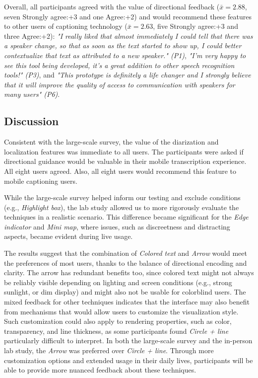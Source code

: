 Overall, all participants agreed with the value of directional feedback ($\bar{x}=2.88$, seven Strongly agree:+3 and one Agree:+2) and would recommend these features to other users of captioning technology ($\bar{x}=2.63$, five Strongly agree:+3 and three Agree:+2): \textit{"I really liked that almost immediately I could tell that there was a speaker change, so that as soon as the text started to show up, I could better contextualize that text as attributed to a new speaker." (P1)}, \textit{"I'm very happy to see this tool being developed, it's a great addition to other speech recognition tools!" (P3)}, and \textit{"This prototype is definitely a life changer and I strongly believe that it will improve the quality of access to communication with speakers for many users" (P6)}.

\subsection{Discussion}
Consistent with the large-scale survey, the value of the diarization and localization features was immediate to all users. The participants were asked if directional guidance would be valuable in their mobile transcription experience. All eight users agreed. Also, all eight users would recommend this feature to mobile captioning users. 

While the large-scale survey helped inform our testing and exclude conditions (e.g., \emph{Highlight box}), the lab study allowed us to more rigorously evaluate the techniques in a realistic scenario. This difference became significant for the \emph{Edge indicator} and \emph{Mini map}, where issues, such as discreetness and distracting aspects, became evident during live usage. 

The results suggest that the combination of \textit{Colored text} and \textit{Arrow} would meet the preferences of most users, thanks to the balance of directional encoding and clarity. The arrow has redundant benefits too, since colored text might not always be reliably visible depending on lighting and screen conditions (e.g., strong sunlight, or dim display) and might also not be usable for colorblind users. The mixed feedback for other techniques indicates that the interface may also benefit from mechanisms that would allow users to customize the visualization style. Such customization could also apply to rendering properties, such as color, transparency, and line thickness, as some participants found \textit{Circle + line} particularly difficult to interpret. In both the large-scale survey and the in-person lab study, the \textit{Arrow} was preferred over \textit{Circle + line}. Through more customization options and extended usage in their daily lives, participants will be able to provide more nuanced feedback about these techniques. 



